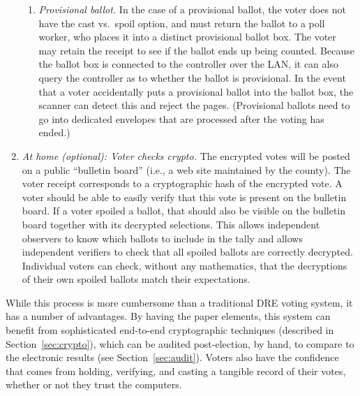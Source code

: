 \begin{enumerate}
\begin{enumerate}
\item {\em Provisional ballot.}
In the case of a provisional ballot, the voter does not have the cast
vs.~spoil option, and must return the ballot to a poll worker, who
places it into a distinct provisional ballot box. The voter may retain
the receipt to see if the ballot ends up being counted. Because the
ballot box is connected to the controller over the LAN, it can also
query the controller as to whether the ballot is provisional. In the
event that a voter accidentally puts a provisional ballot into the
ballot box, the scanner can detect this and reject the
pages. (Provisional ballots need to go into dedicated envelopes that
are processed after the voting has ended.)
\end{enumerate}

\item {\em At home (optional): Voter checks crypto.}
The encrypted votes will be posted on a public ``bulletin board''
 (i.e., a web site maintained by the county).
 The voter receipt corresponds to a cryptographic hash of the encrypted vote.
 A voter should be able to easily verify that this vote is present on the bulletin board.
 If a voter spoiled a ballot, that should also be visible on the bulletin board
 together with its decrypted selections.  This allows independent observers to
 know which ballots to include in the tally and allows independent verifiers
 to check that all spoiled ballots are correctly decrypted.  Individual voters can
 check, without any mathematics,
 that the decryptions of their own spoiled ballots match their expectations.
\end{enumerate}


While this process is more cumbersome than a traditional DRE voting
system, it has a number of advantages. By having the paper elements,
this system can benefit from sophisticated end-to-end cryptographic
techniques (described in Section~\ref{sec:crypto}), which can be
audited post-election, by hand, to compare to the electronic results
(see Section~\ref{sec:audit}). Voters also have the confidence that
comes from holding, verifying, and casting a tangible record of their
votes, whether or not they trust the computers.



